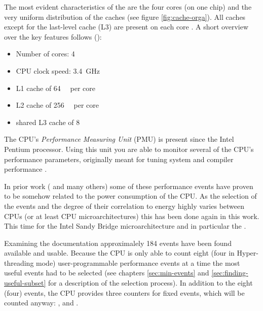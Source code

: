 The most evident characteristics of the \JWPcpu{} are the four cores (on one
chip) and the very uniform distribution of the caches (see figure
\ref{fig:cache-orga}). All caches except for the last-level cache (L3) are
present on each core \cite{fog11}. A short overview over the key features
follows (\cite{intel2011spec}):

\begin{itemize}

\item Number of cores: 4

\item CPU clock speed: \SI{3.4}{\giga\hertz}

\item L1 cache of \SI{64}{\kibi\byte} per core\cite{intel2011softdev1}

\item L2 cache of \SI{256}{\kibi\byte} per core\cite{intel2011softdev1}

\item shared L3 cache of \SI{8}{\mebi\byte}\cite{intel2011softdev1}

\end{itemize}


\label{sec:pmu}

The CPU's \emph{Performance Measuring Unit} (PMU) is present since the
Intel\TReg{} Pentium processor. Using this unit you are able to monitor several
of the CPU's performance parameters, originally meant for tuning system and
compiler performance \cite{intel2011softdev3b}.

In prior work (\cite{bellosa2000benefits,snowdon2010operating,
weissel2002process,kellner03tempcontrol,bertran2010decomposable} and many
others) some of these performance events have proven to be somehow related to
the power consumption of the CPU. As the selection of the events and the degree
of their correlation to energy highly varies between CPUs (or at least CPU
microarchitectures) this has been done again in this work. This time for the
Intel\TReg{} Sandy Bridge microarchitecture and in particular the \JWPcpu{}.

Examining the documentation \cite{intel2011events} approximalely 184 events have
been found available and usable. Because the CPU is only able to count eight
(four in Hyper-threading \cite{wiki:HT} mode) user-programmable performance
events at a time \cite{intel2011softdev1} the most useful events had to be
selected (see chapters \ref{sec:min-events} and \ref{sec:finding-useful-subset}
for a description of  the selection process). In addition to the eight (four)
events, the CPU provides three counters for fixed events, which will be counted
anyway: , 
and .

